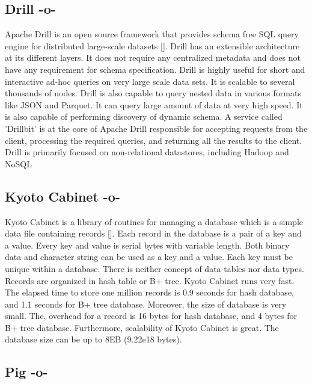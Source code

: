 \subsection{Drill -o-}

Apache Drill is an open source framework that provides schema free SQL
query engine for distributed large-scale
datasets [\cite{www-ApacheDrill}]. Drill has an extensible architecture
at its different layers. It does not require any centralized metadata
and does not have any requirement for schema specification. Drill is
highly useful for short and interactive ad-hoc queries on very large
scale data sets. It is scalable to several thousands of nodes. Drill
is also capable to query nested data in various formats like JSON and
Parquet. It can query large amount of data at very high speed. It is
also capable of performing discovery of dynamic schema.  A service
called 'Drillbit' is at the core of Apache Drill responsible for
accepting requests from the client, processing the required queries,
and returning all the results to the client.  Drill is primarily
focused on non-relational datastores, including Hadoop and NoSQL



\subsection{Kyoto Cabinet -o-}

Kyoto Cabinet is a library of routines for managing a database which
is a simple data file containing records [\cite{www-KyotoCabinet}].
Each record in the database is a pair of a key and a value. Every key
and value is serial bytes with variable length. Both binary data and
character string can be used as a key and a value. Each key must be
unique within a database.  There is neither concept of data tables nor
data types. Records are organized in hash table or B+ tree. Kyoto
Cabinet runs very fast. The elapsed time to store one million records
is 0.9 seconds for hash database, and 1.1 seconds for B+ tree
database. Moreover, the size of database is very small. The, overhead
for a record is 16 bytes for hash database, and 4 bytes for B+ tree
database. Furthermore, scalability of Kyoto Cabinet is great. The
database size can be up to 8EB (9.22e18 bytes).




\subsection{Pig -o-}



